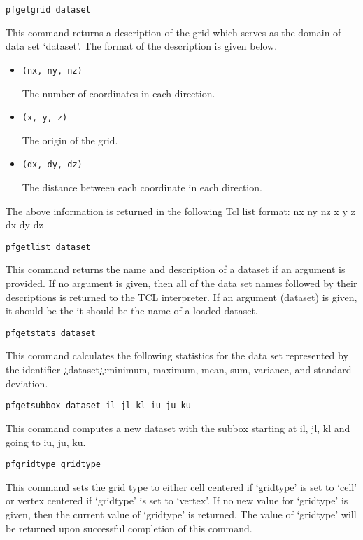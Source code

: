 \begin{description}
\item{\begin{verbatim}pfgetgrid dataset\end{verbatim}}
This command returns a description of the grid which serves as the
domain of data set `dataset'.  The format of the description is given
below.
\begin{itemize}
\item{\begin{verbatim}(nx, ny, nz)\end{verbatim}
The number of coordinates in each direction.}
\item{\begin{verbatim}(x, y, z)\end{verbatim}The origin of the grid.}
\item{\begin{verbatim}(dx, dy, dz)\end{verbatim}The distance between each
coordinate in each direction.}
\end{itemize}
The above information is returned in the following Tcl list format:
{nx ny nz} {x y z} {dx dy dz}

\item{\begin{verbatim}pfgetlist dataset\end{verbatim}}
This command returns the name and description of a dataset if an argument is provided.
If no argument is given, then all of the data set names followed by their descriptions
is returned to the TCL interpreter. If an argument (dataset) is given, it should be the
it should be the name of a loaded dataset.

\item{\begin{verbatim}pfgetstats dataset\end{verbatim}}
This command calculates the following statistics for the data set represented by the
identifier ¿dataset¿:minimum, maximum, mean, sum, variance, and standard deviation.

\item{\begin{verbatim}pfgetsubbox dataset il jl kl iu ju ku\end{verbatim}}
This command computes a new dataset with the subbox starting at il, jl, kl and going to iu, ju, ku.


\item{\begin{verbatim}pfgridtype gridtype\end{verbatim}}
This command sets the grid type to either cell centered if `gridtype'
is set to `cell' or vertex centered if `gridtype' is set to `vertex'.
If no new value for `gridtype' is given, then the current value of
`gridtype' is returned.  The value of `gridtype' will be returned upon
successful completion of this command.



\end{description}
